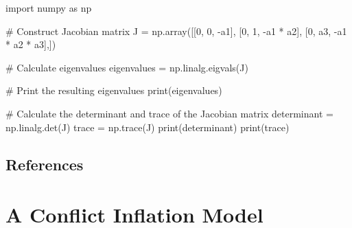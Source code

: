 \documentclass[
  letterpaper,
  DIV=11,
  numbers=noendperiod]{scrreprt}
\newenvironment{Shaded}{\begin{snugshade}}{\end{snugshade}}
\newcommand{\BuiltInTok}[1]{\textcolor[rgb]{0.00,0.23,0.31}{#1}}
\newcommand{\CommentTok}[1]{\textcolor[rgb]{0.37,0.37,0.37}{#1}}
\newcommand{\DecValTok}[1]{\textcolor[rgb]{0.68,0.00,0.00}{#1}}
\newcommand{\ImportTok}[1]{\textcolor[rgb]{0.00,0.46,0.62}{#1}}
\newcommand{\NormalTok}[1]{\textcolor[rgb]{0.00,0.23,0.31}{#1}}
\newcommand{\OperatorTok}[1]{\textcolor[rgb]{0.37,0.37,0.37}{#1}}
\begin{document}
\begin{tcolorbox}[enhanced jigsaw, titlerule=0mm, breakable, bottomrule=.15mm, toprule=.15mm, colbacktitle=quarto-callout-note-color!10!white, rightrule=.15mm, toptitle=1mm, opacityback=0, left=2mm, coltitle=black, title=\textcolor{quarto-callout-note-color}{\faInfo}\hspace{0.5em}{Python code}, colframe=quarto-callout-note-color-frame, opacitybacktitle=0.6, leftrule=.75mm, bottomtitle=1mm, arc=.35mm, colback=white]

\begin{Shaded}
\begin{Highlighting}[]
\ImportTok{import}\NormalTok{ numpy }\ImportTok{as}\NormalTok{ np}

\CommentTok{\# Construct Jacobian matrix }
\NormalTok{J }\OperatorTok{=}\NormalTok{ np.array([[}\DecValTok{0}\NormalTok{, }\DecValTok{0}\NormalTok{, }\OperatorTok{{-}}\NormalTok{a1],}
\NormalTok{          [}\DecValTok{0}\NormalTok{, }\DecValTok{1}\NormalTok{, }\OperatorTok{{-}}\NormalTok{a1 }\OperatorTok{*}\NormalTok{ a2],}
\NormalTok{          [}\DecValTok{0}\NormalTok{, a3, }\OperatorTok{{-}}\NormalTok{a1 }\OperatorTok{*}\NormalTok{ a2 }\OperatorTok{*}\NormalTok{ a3],])}

\CommentTok{\# Calculate eigenvalues}
\NormalTok{eigenvalues }\OperatorTok{=}\NormalTok{ np.linalg.eigvals(J)}

\CommentTok{\# Print the resulting eigenvalues}
\BuiltInTok{print}\NormalTok{(eigenvalues)}

\CommentTok{\# Calculate the determinant and trace of the Jacobian matrix}
\NormalTok{determinant }\OperatorTok{=}\NormalTok{ np.linalg.det(J)}
\NormalTok{trace }\OperatorTok{=}\NormalTok{ np.trace(J)}
\BuiltInTok{print}\NormalTok{(determinant)}
\BuiltInTok{print}\NormalTok{(trace)}
\end{Highlighting}
\end{Shaded}

\end{tcolorbox}

\section{References}\label{references-8}

\chapter{A Conflict Inflation Model}\label{a-conflict-inflation-model}
\end{document}
